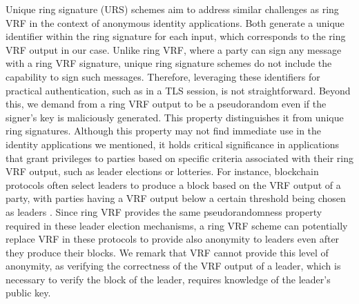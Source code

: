 Unique ring signature (URS) schemes \cite{URCframework} aim to address similar challenges as ring VRF in the context of anonymous identity applications. Both generate a unique identifier within the ring signature for each input, which corresponds to the ring VRF output in our case. Unlike ring VRF, where a party can sign any message with a ring VRF signature, unique ring signature schemes do not include the capability to sign such messages. Therefore, leveraging these identifiers for practical authentication, such as in a TLS session, is not straightforward. 
Beyond this, we demand from a ring VRF output  to be a pseudorandom even if the signer's key is maliciously generated. This property distinguishes it from unique ring signatures. 
Although this property may not find immediate use in the identity applications we mentioned, it holds critical significance in applications that grant privileges to parties based on specific criteria associated with their ring VRF output, such as leader elections or lotteries. 
For instance, blockchain protocols often select leaders to produce a block  based on the VRF output of a party, with parties having a VRF output below a certain threshold being chosen as leaders \cite{praos,genesis}. Since ring VRF provides the same pseudorandomness property required in these leader election mechanisms, a ring VRF scheme  can potentially replace VRF in these protocols to provide also anonymity to leaders even after they produce their blocks. 
We remark that VRF cannot provide this level of anonymity, as verifying the correctness of the VRF output  of a leader, which is necessary to verify the block of the leader, requires knowledge of the leader's public key.




